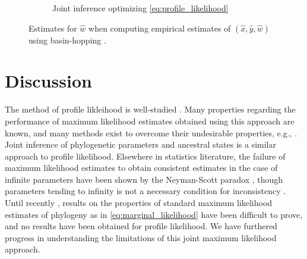 \documentclass{article}
\begin{document}
\begin{figure}
\begin{subfigure}{.45\linewidth}
\caption[short]{Joint inference optimizing \eqref{eq:profile_likelihood}}
\end{subfigure}
\caption{
    Estimates for $\hat{w}$ when computing empirical estimates of $(\hat{x}, \hat{y}, \hat{w})$ using basin-hopping \cite{Wales1997}.
}
\label{fig:bl-general-inconsistency}
\end{figure}

\section*{Discussion}

The method of profile likleihood is well-studied \cite{Murphy2000-ry}.
Many properties regarding the performance of maximum likelihood estimates obtained using this approach are known, and many methods exist to overcome their undesirable properties, e.g., \cite{Geman1982}.
Joint inference of phylogenetic parameters and ancestral states \cite{Sagulenko2017-jo} is a similar approach to profile likelihood.
Elsewhere in statistics literature, the failure of maximum likelihood estimates to obtain consistent estimates in the case of infinite parameters have been shown by the Neyman-Scott paradox \cite{Neyman1948-tt}, though parameters tending to infinity is not a necessary condition for inconsistency \cite{LeCam1990}.
Until recently \cite{RoyChoudhury2015-ta}, results on the properties of standard maximum likelihood estimates of phylogeny as in \eqref{eq:marginal_likelihood} have been difficult to prove, and no results have been obtained for profile likelihood.
We have furthered progress in understanding the limitations of this joint maximum likelihood approach.
\end{document}
